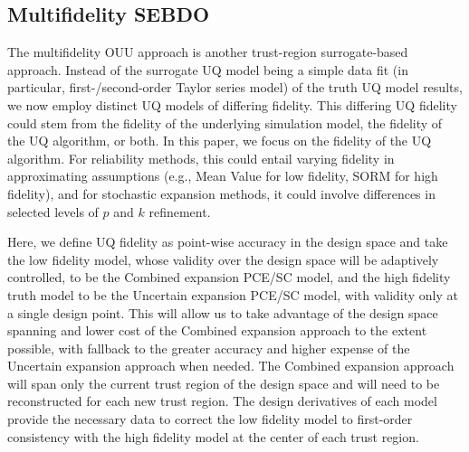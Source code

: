 \subsection{Multifidelity SEBDO} \label{ouu:sebdo:mf}

The multifidelity OUU approach is another trust-region surrogate-based
approach.  Instead of the surrogate UQ model being a simple data fit
(in particular, first-/second-order Taylor series model) of the truth
UQ model results, we now employ distinct UQ models of differing
fidelity.  This differing UQ fidelity could stem from the fidelity of
the underlying simulation model, the fidelity of the UQ algorithm, or
both.  In this paper, we focus on the fidelity of the UQ algorithm.
For reliability methods, this could entail varying fidelity in
approximating assumptions (e.g., Mean Value for low fidelity, SORM for
high fidelity), and for stochastic expansion methods, it could involve
differences in selected levels of $p$ and $k$ refinement.


Here, we define UQ fidelity as point-wise accuracy in the
design space and take the low fidelity model, whose validity over the
design space will be adaptively controlled, to be the Combined
expansion PCE/SC model, and the high fidelity truth model to be the
Uncertain expansion PCE/SC model, with validity only at a single
design point.  This will allow us to take advantage of the design
space spanning and lower cost of the Combined expansion approach to
the extent possible, with fallback to the greater accuracy and higher
expense of the Uncertain expansion approach when needed.  The Combined
expansion approach will span only the current trust region of the
design space and will need to be reconstructed for each new trust region.  
The design derivatives of each model provide the necessary data
to correct the low fidelity model to first-order consistency with the
high fidelity model at the center of each trust region.

